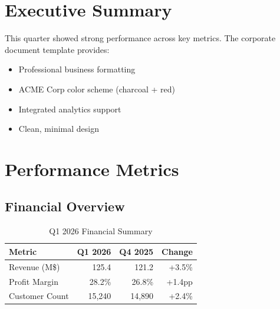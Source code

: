 \documentclass[11pt]{article}
\begin{document}
\maketitle

\begin{abstract}
    This report presents Q1 2026 performance metrics and strategic recommendations for ACME Corporation. It demonstrates the corporate document template with professional formatting suitable for business communications.
\end{abstract}

\tableofcontents
\newpage

\section{Executive Summary}

This quarter showed strong performance across key metrics. The corporate document template provides:

\begin{itemize}
    \item Professional business formatting
    \item ACME Corp color scheme (charcoal + red)
    \item Integrated analytics support
    \item Clean, minimal design
\end{itemize}

\section{Performance Metrics}

\subsection{Financial Overview}

\begin{table}[h]
    \centering
    \caption{Q1 2026 Financial Summary}
    \begin{tabular}{|l|r|r|r|}
        \hline
        \textbf{Metric} & \textbf{Q1 2026} & \textbf{Q4 2025} & \textbf{Change}             \\
        \hline
        Revenue (M\$)   & 125.4            & 121.2            & \textcolor{AcmeRed}{+3.5\%} \\
        Profit Margin   & 28.2\%           & 26.8\%           & \textcolor{AcmeRed}{+1.4pp} \\
        Customer Count  & 15,240           & 14,890           & \textcolor{AcmeRed}{+2.4\%} \\
        \hline
    \end{tabular}
\end{table}
\end{document}
